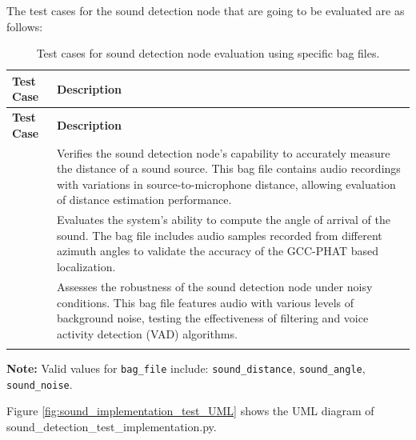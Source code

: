 \documentclass{CSSRforAfrica}
\begin{document}
The test cases for the sound detection node that are going to be evaluated are as follows:

\begin{longtable}{| l | p{13cm} |}
	\hline
	\rowcolor{blue!20}
	\textbf{Test Case} & \textbf{Description} \\
	\hline
	\endfirsthead
	
	\hline
	\rowcolor{blue!20}
	\textbf{Test Case} & \textbf{Description} \\
	\hline
	\endhead
	
	\text{Sound Distance} & Verifies the sound detection node's capability to accurately measure the distance of a sound source. This bag file contains audio recordings with variations in source-to-microphone distance, allowing evaluation of distance estimation performance. \\
	\hline
	\text{Sound Angle} & Evaluates the system's ability to compute the angle of arrival of the sound. The bag file includes audio samples recorded from different azimuth angles to validate the accuracy of the GCC-PHAT based localization. \\
	\hline
	\text{Sound Noise} & Assesses the robustness of the sound detection node under noisy conditions. This bag file features audio with various levels of background noise, testing the effectiveness of filtering and voice activity detection (VAD) algorithms. \\
	\hline
	\caption{Test cases for sound detection node evaluation using specific bag files.}
	\label{tab:sound_detection_tests}
\end{longtable}


\noindent \textbf{Note:} Valid values for \texttt{bag\_file} include: \texttt{sound\_distance}, \texttt{sound\_angle}, \texttt{sound\_noise}.

\newpage

Figure \ref{fig:sound_implementation_test_UML} shows the UML diagram of sound\_detection\_test\_implementation.py.
\end{document}
